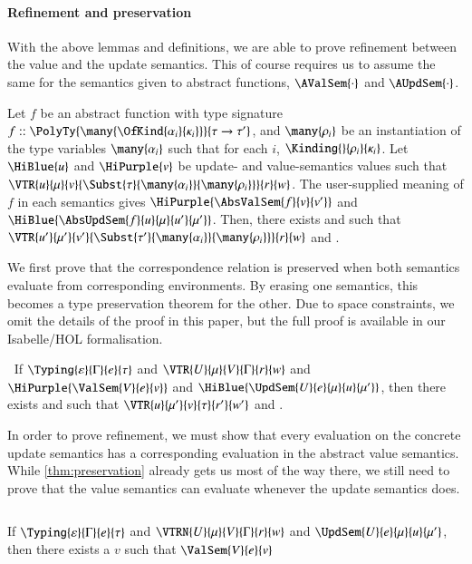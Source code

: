 \documentclass[9pt\ifFinal\else,preprint,nocopyrightspace\fi,\ifAlpha\else natbib,authoryear\fi]{sigplanconf}
\begin{document}
\paragraph{Refinement and preservation}
With the above lemmas and definitions, we are able to prove refinement between the value and the update semantics. This of course requires us to assume the same for
the semantics given to abstract functions, $\AValSem{\cdot}$ and $\AUpdSem{\cdot}$.

\begin{assumption} Let $f$ be an abstract function with type signature $f :: \PolyTy{\many{\OfKind{\alpha_i}{\kappa_i}}}{\tau \rightarrow \tau'}$, and $\many{\rho_i}$ be an
instantiation of the type variables $\many{\alpha_i}$ such that for each $i$, $\Kinding{}{\rho_i}{\kappa_i}$. Let $\HiBlue{u}$ and $\HiPurple{v}$ be update- and value-semantics values such that $\VTR{u}{\mu}{v}{\Subst{\tau}{\many{\alpha_i}}{\many{\rho_i}}}{r}{w}$. The user-supplied meaning of $f$ in each semantics gives $\HiPurple{\AbsValSem{f}{v}{v'}}$ and $\HiBlue{\AbsUpdSem{f}{u}{\mu}{u'}{\mu'}}$. 
Then, there exists  and  such that $\VTR{u'}{\mu'}{v'}{\Subst{\tau'}{\many{\alpha_i}}{\many{\rho_i}}}{r}{w}$ and .
\end{assumption}

\noindent We first prove that the correspondence relation is preserved when both semantics evaluate from corresponding environments. By erasing one semantics, this becomes
a type preservation theorem for the other. Due to space constraints, we omit the details of the proof in this paper, but the full proof is available in our Isabelle/HOL
formalisation.
\begin{theorem}$\ $
\label{thm:preservation}
\noindent If $\Typing{\varepsilon}{\Gamma}{e}{\tau}$ and $\VTR{U}{\mu}{V}{\Gamma}{r}{w}$ and $\HiPurple{\ValSem{V}{e}{v}}$ and $\HiBlue{\UpdSem{U}{e}{\mu}{u}{\mu'}}$, 
then there exists  and  such that $\VTR{u}{\mu'}{v}{\tau}{r'}{w'}$ and .
\end{theorem}

\noindent In order to prove refinement, we must show that every evaluation on the concrete update semantics has a corresponding evaluation in the abstract value semantics. While \autoref{thm:preservation} already gets us most of the way there, we still need to prove that the value semantics can evaluate whenever the update semantics does.
\begin{lemma}$\ $

\noindent If $\Typing{\varepsilon}{\Gamma}{e}{\tau}$ and $\VTRN{U}{\mu}{V}{\Gamma}{r}{w}$ and $\UpdSem{U}{e}{\mu}{u}{\mu'}$, then there exists a $v$ such that $\ValSem{V}{e}{v}$
\end{lemma}
\end{document}
